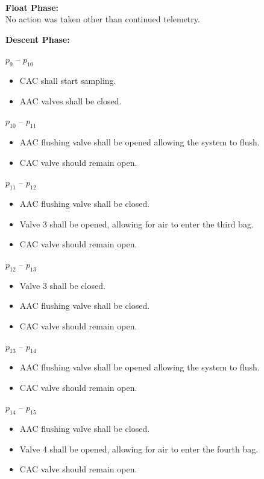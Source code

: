 \textbf{\\Float Phase:}\\
No action was taken other than continued telemetry.
 
\textbf{Descent Phase:}
 
$p_9$ – $p_{10}$
\begin{itemize}
    \item CAC shall start sampling. 
    \item AAC valves shall be closed.
\end{itemize}

$p_{10}$ – $p_{11}$
\begin{itemize}
    \item AAC flushing valve shall be opened allowing the system to flush.
    \item CAC valve should remain open. 
\end{itemize}
 
  
$p_{11}$ – $p_{12}$
\begin{itemize}
    \item AAC flushing valve shall be closed.
    \item Valve 3 shall be opened, allowing for air to enter the third bag.
    \item CAC valve should remain open. 
\end{itemize}

$p_{12}$ – $p_{13}$
\begin{itemize}
    \item Valve 3 shall be closed.
    \item AAC flushing valve shall be closed.
    \item CAC valve should remain open.
\end{itemize}

$p_{13}$ – $p_{14}$
\begin{itemize}
    \item AAC flushing valve shall be opened allowing the system to flush.
    \item CAC valve should remain open.
\end{itemize}

$p_{14}$ – $p_{15}$
\begin{itemize}
    \item AAC flushing valve shall be closed.
    \item Valve 4 shall be opened, allowing for air to enter the fourth bag.
    \item CAC valve should remain open.
\end{itemize}

